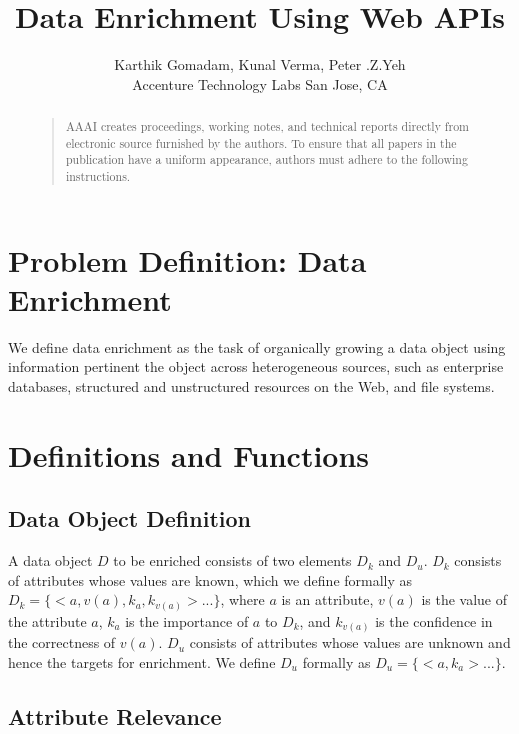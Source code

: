 \documentclass[letterpaper]{article}
\begin{document}
%
\title{Data Enrichment Using Web APIs}
\author{Karthik Gomadam, Kunal Verma, Peter .Z.Yeh\\
Accenture Technology Labs
San Jose, CA\\
}
\maketitle
\begin{abstract}
\begin{quote}
AAAI creates proceedings, working notes, and technical reports directly from electronic source furnished by the authors. To ensure that all papers in the publication have a uniform appearance, authors must adhere to the following 
instructions. 
\end{quote}
\end{abstract}
\section{Problem Definition: Data Enrichment}

We define data enrichment as the task of organically growing a data object using information pertinent the object 
across heterogeneous sources, such as enterprise databases, structured and unstructured resources on the Web, and 
file systems. 


\section{Definitions and Functions}

\subsection{Data Object Definition}

A data object $D$ to be enriched consists of two elements $D_k$ and $D_u$. $D_k$ consists of attributes whose 
values are known, which we define formally as $D_k= \lbrace <a,v(a),k_a,k_{v(a)}> ... \rbrace$, where $a$ is 
an attribute, $v(a)$ is the value of the attribute $a$, $k_a$ is the importance of $a$ to $D_k$, and $k_{v(a)}$ 
is the confidence in the correctness of $v(a)$. $D_u$ consists of attributes whose values are unknown and hence 
the targets for enrichment. We define $D_u$ formally as $D_u= \lbrace <a,k_a> ... \rbrace$.
    
\subsection{Attribute Relevance} 
\end{document}
